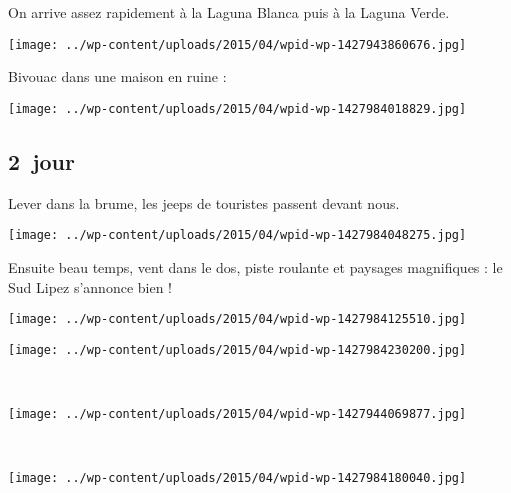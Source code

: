  On arrive assez rapidement à la Laguna Blanca puis à la Laguna Verde.
\begin{center} \texttt{[image: ../wp-content/uploads/2015/04/wpid-wp-1427943860676.jpg]} \end{center}
\vspace{-\topsep}

\pagebreak
 Bivouac dans une maison en ruine :
\begin{center} \texttt{[image: ../wp-content/uploads/2015/04/wpid-wp-1427984018829.jpg]} \end{center}

\subsection*{2\ieme\ jour} 
 Lever dans la brume, les jeeps de touristes passent devant nous.
\begin{center} \texttt{[image: ../wp-content/uploads/2015/04/wpid-wp-1427984048275.jpg]} \end{center}
\vspace{-\topsep}

\pagebreak
 Ensuite beau temps, vent dans le dos, piste roulante et paysages magnifiques : le Sud Lipez s'annonce bien !
\begin{center} \texttt{[image: ../wp-content/uploads/2015/04/wpid-wp-1427984125510.jpg]} \end{center}
\begin{center} \texttt{[image: ../wp-content/uploads/2015/04/wpid-wp-1427984230200.jpg]} \end{center}
\vspace{-\topsep}
\vspace{-3mm}

\pagebreak
~
\begin{center} \texttt{[image: ../wp-content/uploads/2015/04/wpid-wp-1427944069877.jpg]} \end{center}
~\\
\begin{center} \texttt{[image: ../wp-content/uploads/2015/04/wpid-wp-1427984180040.jpg]} \end{center}
\vspace{-\topsep}

